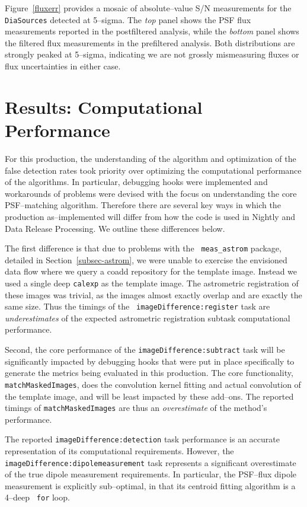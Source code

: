 \documentclass[prd, nofootinbib, floatfix, 11pt,tightenlines,times]{article}
\begin{document}
Figure~\ref{fluxerr} provides a mosaic of absolute--value S/N
measurements for the {\tt DiaSources} detected at 5--sigma.  The {\it
  top} panel shows the PSF flux measurements reported in the
postfiltered analysis, while the {\it bottom} panel shows the filtered
flux measurements in the prefiltered analysis.  Both distributions are
strongly peaked at 5--sigma, indicating we are not grossly
mismeasuring fluxes or flux uncertainties in either case.

\section{Results: Computational Performance}

For this production, the understanding of the algorithm and
optimization of the false detection rates took priority over
optimizing the computational performance of the algorithms.  In
particular, debugging hooks were implemented and workarounds of
problems were devised with the focus on understanding the core
PSF--matching algorithm.  Therefore there are several key ways in
which the production as--implemented will differ from how the code is
used in Nightly and Data Release Processing.  We outline these
differences below.

The first difference is that due to problems with the {\tt
  meas\_astrom} package, detailed in Section~\ref{subsec-astrom}, we
were unable to exercise the envisioned data flow where we query a
coadd repository for the template image.  Instead we used a single
deep {\tt calexp} as the template image.  The astrometric registration
of these images was trivial, as the images almost exactly overlap and
are exactly the same size.  Thus the timings of the {\tt
  imageDifference:register} task are {\it underestimates} of the
expected astrometric registration subtask computational performance.

Second, the core performance of the {\tt imageDifference:subtract}
task will be significantly impacted by debugging hooks that were put
in place specifically to generate the metrics being evaluated in this
production.  The core functionality, {\tt matchMaskedImages}, does the
convolution kernel fitting and actual convolution of the template
image, and will be least impacted by these add--ons.  The reported
timings of {\tt matchMaskedImages} are thus an {\it overestimate} of
the method's performance.

The reported {\tt imageDifference:detection} task performance is an
accurate representation of its computational requirements.  However,
the {\tt imageDifference:dipolemeasurement} task represents a
significant overestimate of the true dipole measurement requirements.
In particular, the PSF--flux dipole measurement is explicitly
sub--optimal, in that its centroid fitting algorithm is a 4--deep {\tt
  for} loop.
\end{document}
